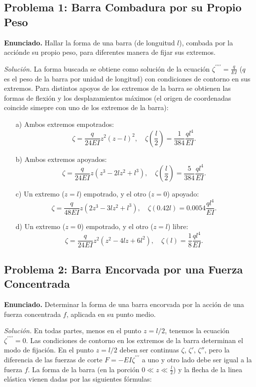 \documentclass{article}
\begin{document}
\subsection*{Problema 1: Barra Combadura por su Propio Peso}
\textbf{Enunciado.} Hallar la forma de una barra (de longuitud $l$), combada por la acciónde su propio peso, para diferentes manera de fijar sus extremos.

\textit{Solución.} La forma buscada se obtiene como solución de la ecuación $\zeta^{\prime\prime\prime\prime} = \frac{q}{EI}$ ($q$ es el peso de la barra por unidad de longitud) con condiciones de contorno en sus extremos. Para distintos apoyos de los extremos de la barra se obtienen las formas de flexión y los desplazamientos máximos (el origen de coordenadas coincide simepre con uno de los extremos de la barra):

\begin{enumerate}
    \item[a)] Ambos extremos empotrados:
    $$
    \zeta = \frac{q}{24EI} z^2(z-l)^2, \quad \zeta\left(\frac{l}{2}\right) = \frac{1}{384} \frac{ql^4}{EI}.
    $$

    \item[b)] Ambos extremos apoyados:
    $$
    \zeta = \frac{q}{24EI} z(z^3 - 2lz^2 + l^3), \quad \zeta\left(\frac{l}{2}\right) = \frac{5}{384} \frac{ql^4}{EI}.
    $$

    \item[c)] Un extremo ($z = l$) empotrado, y el otro ($z = 0$) apoyado:
    $$
    \zeta = \frac{q}{48EI} z(2z^3 - 3lz^2 + l^3), \quad \zeta(0.42l) = 0.0054 \frac{ql^4}{EI}.
    $$

    \item[d)] Un extremo ($z = 0$) empotrado, y el otro ($z = l$) libre:
    $$
    \zeta = \frac{q}{24EI} z^2(z^2 - 4lz + 6l^2), \quad \zeta(l) = \frac{1}{8} \frac{ql^4}{EI}.
    $$
\end{enumerate}

\subsection*{Problema 2: Barra Encorvada por una Fuerza Concentrada}
\textbf{Enunciado.} Determinar la forma de una barra encorvada por la acción de una fuerza concentrada $f$, aplicada en su punto medio.

\textit{Solución.} En todas partes, menos en el punto $z = l/2$, tenemos la ecuación $\zeta^{\prime\prime\prime\prime} = 0$. Las condiciones de contorno en los extremos de la barra determinan el modo de fijación. En el punto $z = l/2$ deben ser continuas $\zeta$, $\zeta'$, $\zeta''$, pero la diferencia de las fuerzas de corte $F=-EI\zeta^{\prime\prime\prime}$ a uno y otro lado debe ser igual a la fuerza $f$.
La forma de la barra (en la porción $0\ll z\ll \frac{l}{2}$) y la flecha de la linea elástica vienen dadas por las siguientes fórmulas:
\end{document}
